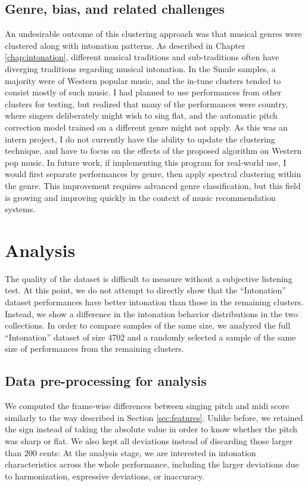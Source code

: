 \subsection{Genre, bias, and related challenges}
An undesirable outcome of this clustering approach was that musical genres were clustered along with intonation patterns. As described in Chapter \ref{chap:intonation}, different musical traditions and sub-traditions often have diverging traditions regarding musical intonation. In the Smule samples, a majority were of Western popular music, and the in-tune clusters tended to consist mostly of such music. I had planned to use performances from other clusters for testing, but realized that many of the performances were country, where singers deliberately might wish to sing flat, and the automatic pitch correction model trained on a different genre might not apply. As this was an intern project, I do not currently have the ability to update the clustering technique, and have to focus on the effects of the proposed algorithm on Western pop music. In future work, if implementing this program for real-world use, I would first separate performances by genre, then apply spectral clustering within the genre. This improvement requires advanced genre classification, but this field is growing and improving quickly in the context of music recommendation systems.  

\section{Analysis}

The quality of the dataset is difficult to measure without a subjective listening test. At this point, we do not attempt to directly show that the ``Intonation'' dataset performances have better intonation than those in the remaining clusters. Instead, we show a difference in the intonation behavior distributions in the two collections. In order to compare samples of the same size, we analyzed the full ``Intonation'' dataset of size 4702 and a randomly selected a sample of the same size of performances from the remaining clusters.

\subsection{Data pre-processing for analysis}
We computed the frame-wise differences between singing pitch and \gls{midi} score similarly to the way described in Section \ref{sec:features}. Unlike before, we retained the sign instead of taking the absolute value in order to know whether the pitch was sharp or flat. We also kept all deviations instead of discarding those larger than 200 cents: At the analysis stage, we are interested in intonation characteristics across the whole performance, including the larger deviations due to harmonization, expressive deviations, or inaccuracy. 

